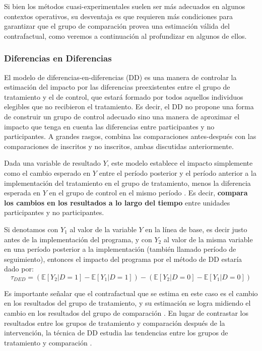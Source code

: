 \documentclass[../../main.tex]{subfiles}
\begin{document}
Si bien los métodos cuasi-experimentales suelen ser más adecuados en algunos contextos
operativos, su desventaja es que requieren más condiciones para garantizar que el grupo de
comparación provea una estimación válida del contrafactual, como veremos a continuación al
profundizar en algunos de ellos.

\subsubsection{Diferencias en Diferencias}
El modelo de diferencias-en-diferencias (DD) es una manera de controlar la estimación del
impacto por las diferencias preexistentes entre el grupo de tratamiento y el de control,
que estará formado por todos aquellos individuos elegibles que no recibieron el
tratamiento. Es decir, el DD no propone una forma de construir un grupo de control
adecuado sino una manera de aproximar el impacto que tenga en cuenta las diferencias entre
participantes y no participantes. A grandes rasgos, combina las comparaciones
antes-después con las comparaciones de inscritos y no inscritos, ambas discutidas
anteriormente.

Dada una variable de resultado \(Y\), este modelo establece el impacto simplemente como el
cambio esperado en \(Y\) entre el período posterior y el período anterior a la
implementación del tratamiento en el grupo de tratamiento, menos la diferencia esperada en
\(Y\) en el grupo de control en el mismo período \cite{bernal}. Es decir, \textbf{compara
los cambios en los resultados a lo largo del tiempo} entre unidades participantes y no
participantes.

Si denotamos con \(Y_1\) al valor de la variable \(Y\) en la línea de base, es decir justo
antes de la implementación del programa, y con \(Y_2\) al valor de la misma variable en
una período posterior a la implementación (también llamado período de seguimiento),
entonces el impacto del programa por el método de DD estaría dado por:
\begin{equation}
    \tau_{DED} =
        \left(
            \mathbb{E}\left[Y_2|D=1\right] - \mathbb{E}\left[Y_1|D=1\right]
        \right) -
        \left(
            \mathbb{E}\left[Y_2|D=0\right] - \mathbb{E}\left[Y_1|D=0\right]
        \right)
        \label{eq:dif-en-dif-1}
\end{equation}

Es importante señalar que el contrafactual que se estima en este caso es el cambio en los
resultados del grupo de tratamiento, y su estimación se logra midiendo el cambio en los
resultados del grupo de comparación \cite{gertler-2016}. En lugar de contrastar los
resultados entre los grupos de tratamiento y comparación después de la intervención, la
técnica de DD estudia las tendencias entre los grupos de tratamiento y comparación
\cite{gertler-2016}.
\end{document}

